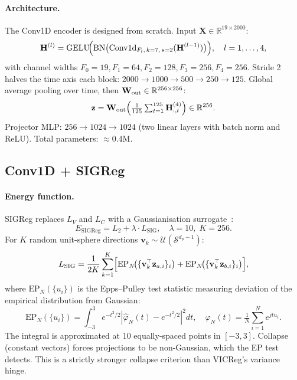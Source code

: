 \documentclass[11pt,a4paper]{article}
\begin{document}
\paragraph{Architecture.}
The Conv1D encoder is designed from scratch.  Input $\mathbf{X} \in \mathbb{R}^{19 \times 2000}$:
\begin{equation}
  \mathbf{H}^{(l)} = \mathrm{GELU}\!\Bigl(\mathrm{BN}\bigl(
    \mathrm{Conv1d}_{F_l,\,k=7,\,s=2}(\mathbf{H}^{(l-1)})\bigr)\Bigr),
  \quad l=1,\ldots,4,
\end{equation}
with channel widths $F_0{=}19, F_1{=}64, F_2{=}128, F_3{=}256, F_4{=}256$.
Stride 2 halves the time axis each block: $2000 \to 1000 \to 500 \to 250 \to 125$.
Global average pooling over time, then $\mathbf{W}_{\rm out} \in \mathbb{R}^{256\times256}$:
\begin{equation}
  \mathbf{z} = \mathbf{W}_{\rm out}\!\left(\tfrac{1}{125}\textstyle\sum_{t=1}^{125}
    \mathbf{H}^{(4)}_{:,t}\right)\in\mathbb{R}^{256}.
\end{equation}
Projector MLP: $256\to1024\to1024$ (two linear layers with batch norm and ReLU).
Total parameters: $\approx 0.4$M.

\subsection{Conv1D + SIGReg}
\label{sec:math_sigreg}

\paragraph{Energy function.}
SIGReg replaces $L_V$ and $L_C$ with a Gaussianisation surrogate~\cite{epps1983}:
\begin{equation}
  \boxed{E_{\mathrm{SIGReg}} = L_2 + \lambda \cdot L_{\mathrm{SIG}}},
  \quad \lambda = 10,\; K{=}256.
\end{equation}
For $K$ random unit-sphere directions $\mathbf{v}_k \sim \mathcal{U}(\mathcal{S}^{d_p-1})$:
\begin{equation}
  L_{\mathrm{SIG}} = \frac{1}{2K}\sum_{k=1}^{K}\Bigl[
    \mathrm{EP}_N\!\bigl(\{\mathbf{v}_k^\top \mathbf{z}_{a,i}\}_i\bigr) +
    \mathrm{EP}_N\!\bigl(\{\mathbf{v}_k^\top \mathbf{z}_{b,i}\}_i\bigr)\Bigr],
\end{equation}
where $\mathrm{EP}_N(\{u_i\})$ is the Epps--Pulley test statistic measuring deviation
of the empirical distribution from Gaussian:
\begin{equation}
  \mathrm{EP}_N(\{u_i\}) = \int_{-3}^{3}
    e^{-t^2/2}\left|\hat\varphi_N(t) - e^{-t^2/2}\right|^2 dt,
  \quad
  \hat\varphi_N(t) = \tfrac{1}{N}\textstyle\sum_{i=1}^N e^{jtu_i}.
\end{equation}
The integral is approximated at 10 equally-spaced points in $[-3,3]$.
Collapse (constant vectors) forces projections to be non-Gaussian, which the EP test
detects.  This is a strictly stronger collapse criterion than VICReg's variance hinge.
\end{document}
